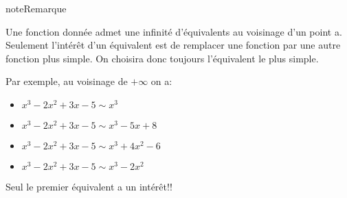 \documentclass[letterpaper,10pt,french]{jupyterBook}
\begin{document}
\begin{sphinxadmonition}{note}{Remarque}

\sphinxAtStartPar
Une fonction donnée admet une infinité d’équivalents au voisinage d’un point a. Seulement l’intérêt
d’un équivalent est de remplacer une fonction par une autre fonction plus simple. On choisira donc toujours l’équivalent le
plus simple.

\sphinxAtStartPar
Par exemple, au voisinage de \(+\infty\) on a:
\begin{itemize}
\item {} 
\sphinxAtStartPar
\(x^3 - 2x^2 + 3x-5 \sim x^3\)

\item {} 
\sphinxAtStartPar
\(x^3 - 2x^2 + 3x-5 \sim x^3-5x+8\)

\item {} 
\sphinxAtStartPar
\(x^3 - 2x^2 + 3x-5 \sim x^3+4x^2-6\)

\item {} 
\sphinxAtStartPar
\(x^3 - 2x^2 + 3x-5 \sim x^3 - 2x^2\)

\end{itemize}

\sphinxAtStartPar
Seul le premier équivalent a un intérêt!!
\end{sphinxadmonition}
\end{document}
